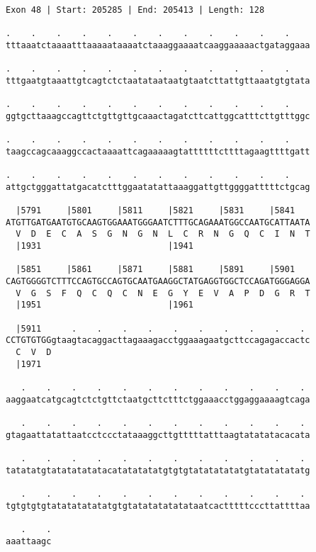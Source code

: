 \documentclass{article}
\begin{document}
\begin{Verbatim}
Exon 48 | Start: 205285 | End: 205413 | Length: 128
 
.    .    .    .    .    .    .    .    .    .    .    .    
tttaaatctaaaatttaaaaataaaatctaaaggaaaatcaaggaaaaactgataggaaa
  
.    .    .    .    .    .    .    .    .    .    .    .    
tttgaatgtaaattgtcagtctctaatataataatgtaatcttattgttaaatgtgtata
  
.    .    .    .    .    .    .    .    .    .    .    .    
ggtgcttaaagccagttctgttgttgcaaactagatcttcattggcatttcttgtttggc
  
.    .    .    .    .    .    .    .    .    .    .    .    
taagccagcaaaggccactaaaattcagaaaaagtattttttcttttagaagttttgatt
  
.    .    .    .    .    .    .    .    .    .    .    .    
attgctgggattatgacatctttggaatatattaaaggattgttggggatttttctgcag
  
  |5791     |5801     |5811     |5821     |5831     |5841   
ATGTTGATGAATGTGCAAGTGGAAATGGGAATCTTTGCAGAAATGGCCAATGCATTAATA
  V  D  E  C  A  S  G  N  G  N  L  C  R  N  G  Q  C  I  N  T
  |1931                         |1941                       
  
  |5851     |5861     |5871     |5881     |5891     |5901   
CAGTGGGGTCTTTCCAGTGCCAGTGCAATGAAGGCTATGAGGTGGCTCCAGATGGGAGGA
  V  G  S  F  Q  C  Q  C  N  E  G  Y  E  V  A  P  D  G  R  T
  |1951                         |1961                       
  
  |5911      .    .    .    .    .    .    .    .    .    . 
CCTGTGTGGgtaagtacaggacttagaaagacctggaaagaatgcttccagagaccactc
  C  V  D                                                   
  |1971                                                     
  
   .    .    .    .    .    .    .    .    .    .    .    . 
aaggaatcatgcagtctctgttctaatgcttctttctggaaacctggaggaaaagtcaga
  
   .    .    .    .    .    .    .    .    .    .    .    . 
gtagaattatattaatcctccctataaaggcttgtttttatttaagtatatatacacata
  
   .    .    .    .    .    .    .    .    .    .    .    . 
tatatatgtatatatatatacatatatatatgtgtgtatatatatatgtatatatatatg
  
   .    .    .    .    .    .    .    .    .    .    .    . 
tgtgtgtgtatatatatatatgtgtatatatatatataatcactttttcccttattttaa
  
   .    .
aaattaagc
\end{Verbatim}
\newpage
\end{document}
